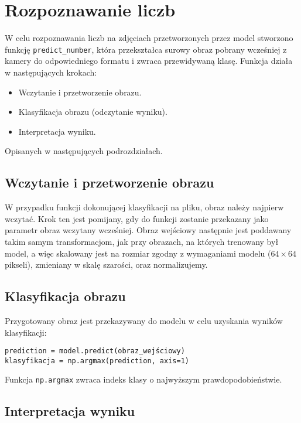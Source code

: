 \section{Rozpoznawanie liczb}\label{sec:funkcja-predict}

W celu rozpoznawania liczb na zdjęciach przetworzonych przez model stworzono funkcję \texttt{predict\_number},
która przekształca surowy obraz pobrany wcześniej z kamery do odpowiedniego formatu i zwraca przewidywaną klasę.
Funkcja działa w następujących krokach:
\begin{itemize}
    \item Wczytanie i przetworzenie obrazu.
    \item Klasyfikacja obrazu (odczytanie wyniku).
    \item Interpretacja wyniku.
\end{itemize}
Opisanych w następujących podrozdziałach.

\subsection{Wczytanie i przetworzenie obrazu}\label{subsec:wczytanie-i-przetworzenie-obrazu}

W przypadku funkcji dokonującej klasyfikacji na pliku, obraz należy najpierw wczytać.
Krok ten jest pomijany, gdy do funkcji zostanie przekazany jako parametr obraz wczytany wcześniej.
Obraz wejściowy następnie jest poddawany takim samym transformacjom, jak przy obrazach, na których trenowany był model,
a więc skalowany jest na rozmiar zgodny z wymaganiami modelu ($64 \times 64$ pikseli), zmieniany w skalę szarości, oraz normalizujemy.

\subsection{Klasyfikacja obrazu}\label{subsec:klasyfikacja-obrazu}

Przygotowany obraz jest przekazywany do modelu w celu uzyskania wyników klasyfikacji:

\begin{verbatim}
prediction = model.predict(obraz_wejściowy)
klasyfikacja = np.argmax(prediction, axis=1)
\end{verbatim}

Funkcja \texttt{np.argmax} zwraca indeks klasy o najwyższym prawdopodobieństwie.

\subsection{Interpretacja wyniku}\label{subsec:interpretacja-wyniku}

